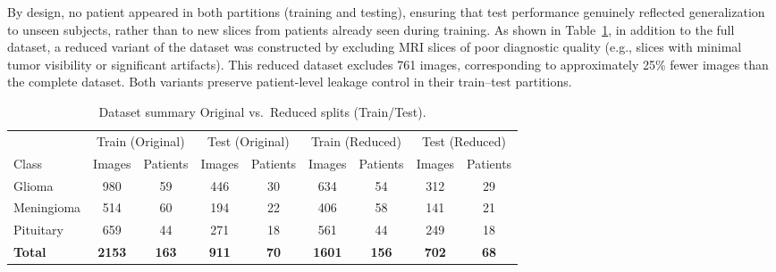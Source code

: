 By design, no patient appeared in both partitions (training and testing), ensuring that test performance genuinely reflected generalization to unseen subjects, rather than to new slices from patients already seen during training. As shown in Table~\ref{tab:dataset_all_one}, in addition to the full dataset, a reduced variant of the dataset was constructed by excluding MRI slices of poor diagnostic quality (e.g., slices with minimal tumor visibility or significant artifacts). This reduced dataset excludes 761 images, corresponding to approximately 25\% fewer images than the complete dataset. Both variants preserve patient-level leakage control in their train--test partitions.

\begin{table}[ht]
\centering
\caption{Dataset summary Original vs.\ Reduced splits (Train/Test).}
\label{tab:dataset_all_one}
\setlength{\tabcolsep}{5pt}
\begin{tabular}{lcccccccc}
\toprule
 & \multicolumn{2}{c}{Train (Original)} & \multicolumn{2}{c}{Test (Original)} & \multicolumn{2}{c}{Train (Reduced)} & \multicolumn{2}{c}{Test (Reduced)} \\
\cmidrule(lr){2-3}\cmidrule(lr){4-5}\cmidrule(lr){6-7}\cmidrule(lr){8-9}
Class & Images & Patients & Images & Patients & Images & Patients & Images & Patients \\
\midrule
Glioma     & 980 & 59 & 446 & 30 & 634 & 54 & 312 & 29 \\
Meningioma & 514 & 60 & 194 & 22 & 406 & 58 & 141 & 21 \\
Pituitary  & 659 & 44 & 271 & 18 & 561 & 44 & 249 & 18 \\
\midrule
\textbf{Total} & \textbf{2153} & \textbf{163} & \textbf{911} & \textbf{70} & \textbf{1601} & \textbf{156} & \textbf{702} & \textbf{68} \\
\bottomrule
\end{tabular}
\end{table}

\newpage
